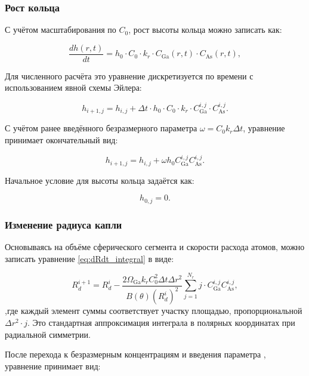 \documentclass[14pt,oneside]{extarticle}
\begin{document}
\subsubsection{Рост кольца}

С учётом масштабирования по \( C_0 \), рост высоты кольца можно записать как:

\begin{equation}
\frac{d h(r,t)}{d t} = h_0 \cdot C_0 \cdot k_r \cdot C_{\text{Ga}}(r,t) \cdot C_{\text{As}}(r,t),
\end{equation}

Для численного расчёта это уравнение дискретизуется по времени с использованием явной схемы Эйлера:

\begin{equation}
h_{i+1,j} = h_{i,j} + \Delta t \cdot h_0 \cdot C_0 \cdot k_r \cdot C_{\text{Ga}}^{i,j} \cdot C_{\text{As}}^{i,j}.
\end{equation}

С учётом ранее введённого безразмерного параметра \( \omega = C_0 k_r \Delta t \), уравнение принимает окончательный вид:

\begin{equation}
h_{i+1,j} = h_{i,j} + \omega h_0 C_{\text{Ga}}^{i,j} C_{\text{As}}^{i,j}.
\end{equation}

Начальное условие для высоты кольца задаётся как:

\begin{equation}
h_{0,j} = 0.
\end{equation}

\subsubsection{Изменение радиуса капли}

Основываясь на объёме сферического сегмента и скорости расхода атомов, можно записать уравнение \eqref{eq:dRdt_integral} в виде:

\begin{equation}
R_d^{i+1} = R_d^i - \frac{2 \Omega_{\text{Ga}} k_r C_0^2 \Delta t \Delta r^2}{B(\theta) (R_d^i)^2} \sum_{j=1}^{N_r} j \cdot C_{\text{Ga}}^{i,j} C_{\text{As}}^{i,j},
\end{equation}
,где каждый элемент суммы соответствует участку площадью, пропорциональной $\Delta r^2 \cdot j$. Это стандартная аппроксимация интеграла в полярных координатах при радиальной симметрии.

После перехода к безразмерным концентрациям и введения параметра , уравнение принимает вид:
\end{document}
